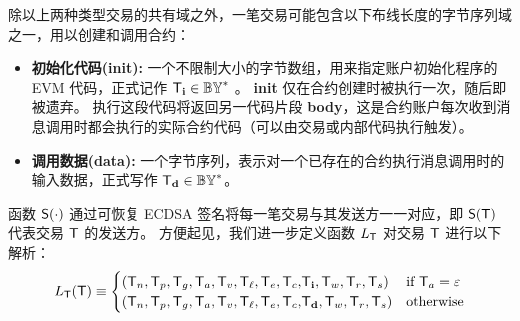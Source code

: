\smallskip
除以上两种类型交易的共有域之外，一笔交易可能包含以下布线长度的字节序列域之一，用以创建和调用合约：
\begin{itemize}[nosep]
 	\item {\bf 初始化代码(init):} 
 	一个不限制大小的字节数组，用来指定账户初始化程序的 EVM 代码，正式记作 $\textsf{T}_{\bf i} \in \mathbb{BY}^*$ 。
 	{\bf init} 仅在合约创建时被执行一次，随后即被遗弃。
 	执行这段代码将返回另一代码片段 {\bf body}，这是合约账户每次收到消息调用时都会执行的实际合约代码（可以由交易或内部代码执行触发）。 


 	\item {\bf 调用数据(data):} 一个字节序列，表示对一个已存在的合约执行消息调用时的输入数据，正式写作 $\textsf{T}_{\bf d}\in \mathbb{BY}^*$。

 \end{itemize} 

函数 $\mathsf{S}{\left({\cdot} \right)}$ 通过可恢复 ECDSA 签名将每一笔交易与其发送方一一对应，即 $\mathsf{S}{\left({\textsf{T}} \right)}$ 代表交易 $\textsf{T}$ 的发送方。
%
方便起见，我们进一步定义函数 $L_{\textsf{T}}$ 对交易 $\textsf{T}$ 进行以下解析：
\begin{align}\label{def:tx_prepare}
	L_{\textsf{T}}(\textsf{T})\equiv 
	\begin{cases}
	\left(\textsf{T}_n, \textsf{T}_p, \textsf{T}_g, \textsf{T}_a, \textsf{T}_v, {\textsf{T}_\ell,\textsf{T}_e,\textsf{T}_c,} \textsf{T}_{\bf i}, \textsf{T}_w,\textsf{T}_r,\textsf{T}_s \right) & \mbox{if $\textsf{T}_a=\mathbb{\varepsilon}$} \\
	\left(\textsf{T}_n, \textsf{T}_p, \textsf{T}_g, \textsf{T}_a, \textsf{T}_v, {\textsf{T}_\ell,\textsf{T}_e,\textsf{T}_c,} \textsf{T}_{\bf d}, \textsf{T}_w,\textsf{T}_r,\textsf{T}_s \right) & \mbox{otherwise}
	\end{cases}
\end{align}

